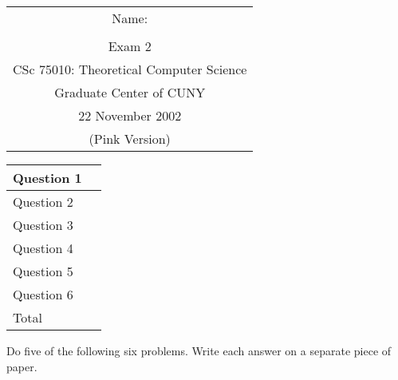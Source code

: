\documentclass[11pt]{article}
\begin{document}
{\bf
\begin{tabular}{c}
	Name: \underline{\hspace{2.5in}}\\ \\
	{\large Exam 2}\\
        	CSc 75010: Theoretical Computer Science\\
        	Graduate Center of CUNY\\
	22 November 2002\\
        	(Pink Version)
\end{tabular}
}
\hfill
\begin{tabular}{|l|c|}
\hline
Question 1 & \mbox{\hspace{.5in}}\\
\hline        	
Question 2 & \\
\hline
Question 3 & \\
\hline
        	Question 4 & \\
\hline
        	Question 5 & \\
\hline
        	Question 6 & \\
\hline\hline
         Total & \\
\hline
\end{tabular}

Do five of the following six problems.  Write each answer on a separate
piece of paper.
\end{document}
